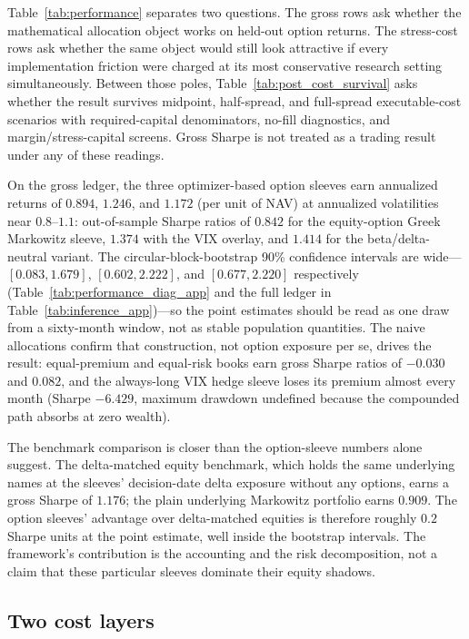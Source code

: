 Table~\ref{tab:performance} separates two questions. The gross rows ask whether the
mathematical allocation object works on held-out option returns. The stress-cost rows ask
whether the same object would still look attractive if every implementation friction were
charged at its most conservative research setting simultaneously. Between those poles,
Table~\ref{tab:post_cost_survival} asks whether the result survives midpoint, half-spread,
and full-spread executable-cost scenarios with required-capital denominators, no-fill
diagnostics, and margin/stress-capital screens. Gross Sharpe is not treated as a trading
result under any of these readings.

On the gross ledger, the three optimizer-based option sleeves earn annualized returns of
\(0.894\), \(1.246\), and \(1.172\) (per unit of NAV) at annualized volatilities near
\(0.8\)--\(1.1\): out-of-sample Sharpe ratios of \(0.842\) for the equity-option Greek
Markowitz sleeve, \(1.374\) with the VIX overlay, and \(1.414\) for the beta/delta-neutral
variant. The circular-block-bootstrap 90\% confidence intervals are wide---\([0.083,
1.679]\), \([0.602, 2.222]\), and \([0.677, 2.220]\) respectively
(Table~\ref{tab:performance_diag_app} and the full ledger in
Table~\ref{tab:inference_app})---so the point estimates should be read as one draw from a
sixty-month window, not as stable population quantities. The naive allocations confirm
that construction, not option exposure per se, drives the result: equal-premium and
equal-risk books earn gross Sharpe ratios of \(-0.030\) and \(0.082\), and the always-long
VIX hedge sleeve loses its premium almost every month (Sharpe \(-6.429\), maximum drawdown
undefined because the compounded path absorbs at zero wealth).

The benchmark comparison is closer than the option-sleeve numbers alone suggest. The
delta-matched equity benchmark, which holds the same underlying names at the sleeves'
decision-date delta exposure without any options, earns a gross Sharpe of \(1.176\); the
plain underlying Markowitz portfolio earns \(0.909\). The option sleeves' advantage over
delta-matched equities is therefore roughly \(0.2\) Sharpe units at the point estimate,
well inside the bootstrap intervals. The framework's contribution is the accounting and
the risk decomposition, not a claim that these particular sleeves dominate their equity
shadows.

\subsection{Two cost layers}

